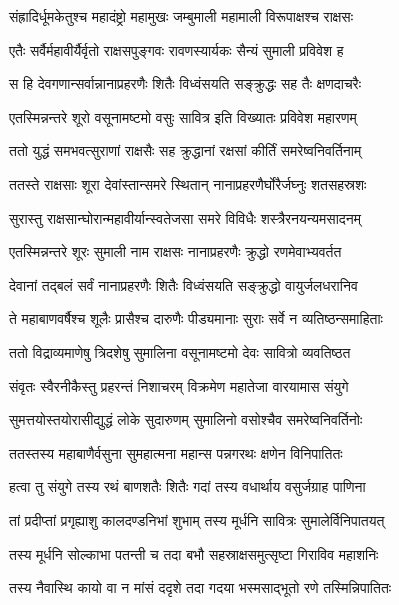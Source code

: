 \twolineshloka
{संह्रादिर्धूमकेतुश्च महादंष्ट्रो महामुखः}
{जम्बुमाली महामाली विरूपाक्षश्च राक्षसः} %

\twolineshloka
{एतैः सर्वैर्महावीर्यैर्वृतो राक्षसपुङ्गवः}
{रावणस्यार्यकः सैन्यं सुमाली प्रविवेश ह} %

\twolineshloka
{स हि देवगणान्सर्वान्नानाप्रहरणैः शितैः}
{विध्वंसयति सङ्क्रुद्धः सह तैः क्षणदाचरैः} %

\twolineshloka
{एतस्मिन्नन्तरे शूरो वसूनामष्टमो वसुः}
{सावित्र इति विख्यातः प्रविवेश महारणम्} %

\twolineshloka
{ततो युद्धं समभवत्सुराणां राक्षसैः सह}
{क्रुद्धानां रक्षसां कीर्तिं समरेष्वनिवर्तिनाम्} %

\twolineshloka
{ततस्ते राक्षसाः शूरा देवांस्तान्समरे स्थितान्}
{नानाप्रहरणैर्घोरैर्जघ्नुः शतसहस्रशः} %

\twolineshloka
{सुरास्तु राक्षसान्घोरान्महावीर्यान्स्वतेजसा}
{समरे विविधैः शस्त्रैरनयन्यमसादनम्} %

\twolineshloka
{एतस्मिन्नन्तरे शूरः सुमाली नाम राक्षसः}
{नानाप्रहरणैः क्रुद्धो रणमेवाभ्यवर्तत} %

\twolineshloka
{देवानां तद्बलं सर्वं नानाप्रहरणैः शितैः}
{विध्वंसयति सङ्क्रुद्धो वायुर्जलधरानिव} %

\twolineshloka
{ते महाबाणवर्षैश्च शूलैः प्रासैश्च दारुणैः}
{पीड्यमानाः सुराः सर्वे न व्यतिष्ठन्समाहिताः} %

\twolineshloka
{ततो विद्राव्यमाणेषु त्रिदशेषु सुमालिना}
{वसूनामष्टमो देवः सावित्रो व्यवतिष्ठत} %

\twolineshloka
{संवृतः स्वैरनीकैस्तु प्रहरन्तं निशाचरम्}
{विक्रमेण महातेजा वारयामास संयुगे} %

\twolineshloka
{सुमत्तयोस्तयोरासीद्युद्धं लोके सुदारुणम्}
{सुमालिनो वसोश्चैव समरेष्वनिवर्तिनोः} %

\twolineshloka
{ततस्तस्य महाबाणैर्वसुना सुमहात्मना}
{महान्स पन्नगरथः क्षणेन विनिपातितः} %

\twolineshloka
{हत्वा तु संयुगे तस्य रथं बाणशतैः शितैः}
{गदां तस्य वधार्थाय वसुर्जग्राह पाणिना} %

\twolineshloka
{तां प्रदीप्तां प्रगृह्याशु कालदण्डनिभां शुभाम्}
{तस्य मूर्धनि सावित्रः सुमालेर्विनिपातयत्} %

\twolineshloka
{तस्य मूर्धनि सोल्काभा पतन्ती च तदा बभौ}
{सहस्राक्षसमुत्सृष्टा गिराविव महाशनिः} %

\twolineshloka
{तस्य नैवास्थि कायो वा न मांसं ददृशे तदा}
{गदया भस्मसाद्भूतो रणे तस्मिन्निपातितः} %

